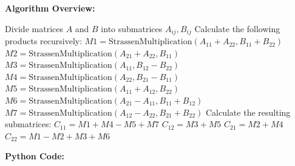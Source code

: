 \documentclass[12pt]{book} %
\begin{document}
\textbf{Algorithm Overview:}
\FloatBarrier
\begin{algorithm}
\caption{Strassen's Algorithm for Matrix Multiplication}

\begin{algorithmic}
        \State {}
    \EndIf
    \State Divide matrices $A$ and $B$ into submatrices $A_{ij}, B_{ij}$
    \State Calculate the following products recursively:
        \State $M1 = \text{StrassenMultiplication}(A_{11} + A_{22}, B_{11} + B_{22})$
        \State $M2 = \text{StrassenMultiplication}(A_{21} + A_{22}, B_{11})$
        \State $M3 = \text{StrassenMultiplication}(A_{11}, B_{12} - B_{22})$
        \State $M4 = \text{StrassenMultiplication}(A_{22}, B_{21} - B_{11})$
        \State $M5 = \text{StrassenMultiplication}(A_{11} + A_{12}, B_{22})$
        \State $M6 = \text{StrassenMultiplication}(A_{21} - A_{11}, B_{11} + B_{12})$
        \State $M7 = \text{StrassenMultiplication}(A_{12} - A_{22}, B_{21} + B_{22})$
    \State Calculate the resulting submatrices:
        \State $C_{11} = M1 + M4 - M5 + M7$
        \State $C_{12} = M3 + M5$
        \State $C_{21} = M2 + M4$
        \State $C_{22} = M1 - M2 + M3 + M6$
    \State {}
\EndFunction
\end{algorithmic}
\end{algorithm}
\FloatBarrier
\textbf{Python Code: }
\FloatBarrier
\end{document}
